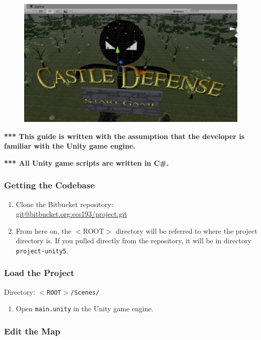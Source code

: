 \documentclass[a4paper]{refart}
\begin{document}
\begin{figure}[h]
	\centering
	\includegraphics[width=\textwidth]{scene.jpg}
\end{figure}


\textbf{*** This guide is written with the assumption that the developer is familiar with the Unity game engine.}

\textbf{*** All Unity game scripts are written in C\#.}

\subsubsection{Getting the Codebase}

\begin{enumerate}
	\item Clone the Bitbucket repository:\\ \url{git@bitbucket.org:ecs193/project.git}
	\item From here on, the $<$ROOT$>$ directory will be referred to where the project directory is. If you pulled directly from the repository, it will be in directory \texttt{project-unity5}.
\end{enumerate}

\subsubsection{Load the Project}

Directory: \texttt{$<$ROOT$>$/Scenes/}

\begin{enumerate}
	\item Open \texttt{main.unity} in the Unity game engine.
\end{enumerate}

\subsubsection{Edit the Map}
\end{document}
